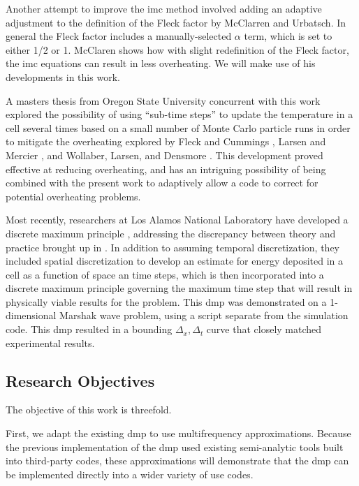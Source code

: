 Another attempt to improve the \gls{imc} method involved adding an adaptive adjustment to the definition of the Fleck factor by McClarren and Urbatsch.  In general the Fleck factor includes a manually-selected $\alpha$ term, which is set to either 1/2 or 1.  McClaren shows how with slight redefinition of the Fleck factor, the \gls{imc} equations can result in less overheating.  We will make use of his developments in this work.

A masters thesis from Oregon State University \cite{long} concurrent with this work explored the possibility of using ``sub-time steps'' to update the temperature in a cell several times based on a small number of Monte Carlo particle runs in order to mitigate the overheating explored by Fleck and Cummings \cite{FleckCumm}, Larsen and Mercier \cite{LarsMerc}, and Wollaber, Larsen, and Densmore \cite{WolLarDen}.  This development proved effective at reducing overheating, and has an intriguing possibility of being combined with the present work to adaptively allow a code to correct for potential overheating problems.

Most recently, researchers at Los Alamos National Laboratory have developed a discrete maximum principle \cite{WolLarDen}, addressing the discrepancy between theory and practice brought up in \cite{LarsMerc}.  In addition to assuming temporal discretization, they included spatial discretization to develop an estimate for energy deposited in a cell as a function of space an time steps, which is then incorporated into a discrete maximum principle governing the maximum time step that will result in physically viable results for the problem.  This \gls{dmp} was demonstrated on a 1-dimensional Marshak wave problem, using a script separate from the simulation code.  This \gls{dmp} resulted in a bounding $\Delta_x, \Delta_t$ curve that closely matched experimental results.



\subsection{Research Objectives}
The objective of this work is threefold.

First, we adapt the existing \gls{dmp} to use multifrequency approximations.  Because the previous implementation of the \gls{dmp} used existing semi-analytic tools built into third-party codes, these approximations will demonstrate that the \gls{dmp} can be implemented directly into a wider variety of use codes.

